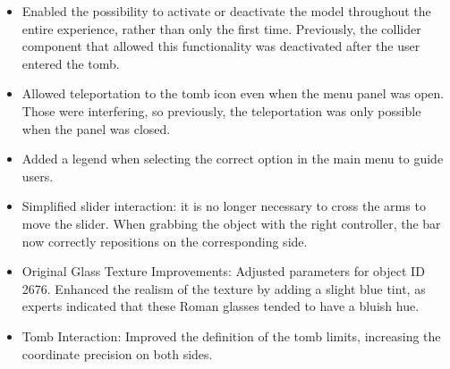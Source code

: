 \begin{itemize}
 \item Enabled the possibility to activate or deactivate the model throughout the entire experience, rather than only the first time. Previously, the collider component that allowed this functionality was deactivated after the user entered the tomb.
 \item Allowed teleportation to the tomb icon even when the menu panel was open. Those were interfering, so previously, the teleportation was only possible when the panel was closed.
 \item Added a legend when selecting the correct option in the main menu to guide users.
 \item Simplified slider interaction: it is no longer necessary to cross the arms to move the slider. When grabbing the object with the right controller, the bar now correctly repositions on the corresponding side.
 \item Original Glass Texture Improvements: Adjusted parameters for object ID 2676. Enhanced the realism of the texture by adding a slight blue tint, as experts indicated that these Roman glasses tended to have a bluish hue.
 \item Tomb Interaction: Improved the definition of the tomb limits, increasing the coordinate precision on both sides.
\end{itemize}

